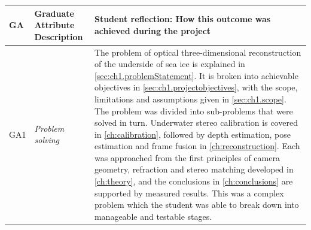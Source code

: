 {\small
\renewcommand{\arraystretch}{1.5}
\begin{longtable}{>{\raggedright\arraybackslash}p{} >{\raggedright\arraybackslash}p{} >{\noindent\justifying\arraybackslash}p{}}
\toprule
\textbf{GA} & \textbf{Graduate Attribute Description} & \textbf{Student reflection: How this outcome was achieved during the project} \\
\midrule
\endhead

GA1 & \textit{Problem solving} &
The problem of optical three-dimensional reconstruction of the underside of sea ice is explained in \autoref{sec:ch1.problemStatement}. It is broken into achievable objectives in
\autoref{sec:ch1.projectobjectives}, with the scope, limitations and assumptions given in \autoref{sec:ch1.scope}.
The problem was divided into sub-problems that were solved in turn. Underwater stereo calibration is covered
in \autoref{ch:calibration}, followed by depth estimation, pose estimation and frame fusion
in \autoref{ch:reconstruction}. Each was approached from the first principles of camera geometry, refraction and
stereo matching developed in \autoref{ch:theory}, and the conclusions in
\autoref{ch:conclusions} are supported by measured results. This was a complex problem which the
student was able to break down into manageable and testable stages. \\


\end{longtable}}
